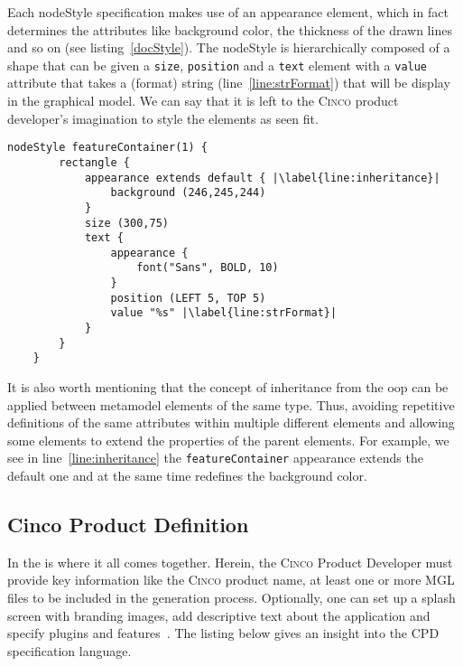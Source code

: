 Each nodeStyle specification makes use of an appearance element, which in fact determines the attributes like background color, the thickness of the drawn lines and so on (see listing~\ref{docStyle}). The nodeStyle is hierarchically composed of a shape that can be given a \lstinline[language=MGL]{size}, \lstinline[language=MGL]{position} and a \lstinline[language=MGL]{text} element with a \lstinline[language=MGL]{value} attribute that takes a (format) string (line~\ref{line:strFormat}) that will be display in the graphical model. We can say that it is left to the \textsc{Cinco} product developer's imagination to style the elements as seen fit.

\begin{lstlisting}[language=MGL, caption={Excerpt from feature.style to be applied to feature.mgl}, label=docStyle, escapechar=|, name=docMSL]
    nodeStyle featureContainer(1) {
        rectangle {
            appearance extends default { |\label{line:inheritance}|
                background (246,245,244)
            }
            size (300,75)
            text {
                appearance {
                    font("Sans", BOLD, 10)
                }
                position (LEFT 5, TOP 5)
                value "%s" |\label{line:strFormat}|
            }
        }
    }
\end{lstlisting}

It is also worth mentioning that the concept of inheritance from the \gls*{oop} can be applied between metamodel elements of the same type. Thus, avoiding repetitive definitions of the same attributes within multiple different elements and allowing some elements to extend the properties of the parent elements. For example, we see in line~\ref{line:inheritance} the \lstinline{featureContainer} appearance extends the default one and at the same time redefines the background color.

\subsection{Cinco Product Definition}\label{sec:CPD}

In the  is where it all comes together. Herein, the \textsc{Cinco} Product Developer must provide key information like the \textsc{Cinco} product name, at least one or more MGL files to be included in the generation process. Optionally, one can set up a splash screen with branding images, add descriptive text about the application and specify plugins and features~\cite{gitlabcinco}.
The listing below gives an insight into the CPD specification language.

